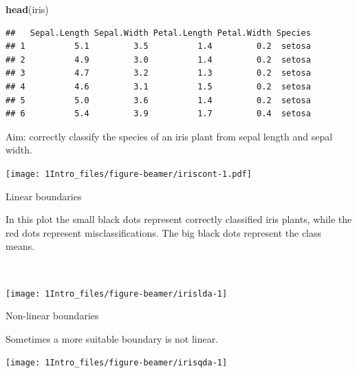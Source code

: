 \documentclass[10pt,ignorenonframetext,]{beamer}
\newenvironment{Shaded}{\begin{snugshade}}{\end{snugshade}}
\newcommand{\KeywordTok}[1]{\textcolor[rgb]{0.13,0.29,0.53}{\textbf{#1}}}
\newcommand{\NormalTok}[1]{#1}
\begin{document}
\begin{frame}[fragile]

\scriptsize

\begin{Shaded}
\begin{Highlighting}[]
\KeywordTok{head}\NormalTok{(iris)}
\end{Highlighting}
\end{Shaded}

\begin{verbatim}
##   Sepal.Length Sepal.Width Petal.Length Petal.Width Species
## 1          5.1         3.5          1.4         0.2  setosa
## 2          4.9         3.0          1.4         0.2  setosa
## 3          4.7         3.2          1.3         0.2  setosa
## 4          4.6         3.1          1.5         0.2  setosa
## 5          5.0         3.6          1.4         0.2  setosa
## 6          5.4         3.9          1.7         0.4  setosa
\end{verbatim}

\normalsize

\end{frame}

\begin{frame}

Aim: correctly classify the species of an iris plant from sepal length
and sepal width.

\texttt{[image: 1Intro\_files/figure-beamer/iriscont-1.pdf]}

\end{frame}

\begin{frame}

\begin{block}{Linear boundaries}

\vspace{1mm}

In this plot the small black dots represent correctly classified iris
plants, while the red dots represent misclassifications. The big black
dots represent the class means.

~

\texttt{[image: 1Intro\_files/figure-beamer/irislda-1]}

\end{block}

\end{frame}

\begin{frame}

\begin{block}{Non-linear boundaries}

\vspace{1mm}

Sometimes a more suitable boundary is not linear.\\
\hspace*{0.333em}

\texttt{[image: 1Intro\_files/figure-beamer/irisqda-1]}

\end{block}

\end{frame}
\end{document}
